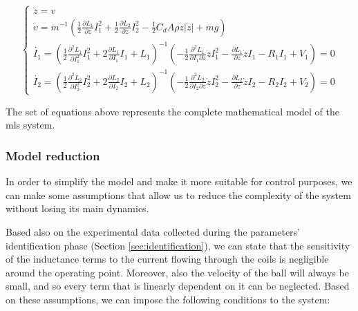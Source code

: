 \begin{equation}
    \begin{cases}
        \dot{z} = v                                                                                                                                                                                                                                                                                       \\
        \dot{v} = m^{-1} \left(\frac{1}{2} \frac{\partial L_1}{\partial z} I_1^2 + \frac{1}{2} \frac{\partial L_2}{\partial z} I_2^2 - \frac{1}{2} C_d A \rho \dot{z} |\dot{z}| + m g  \right)                                                                                                            \\

        \dot{I_1} = \left( \frac{1}{2} \frac{\partial^2 L_1}{\partial I_1^2} I_1^2 + 2\frac{\partial L_1}{\partial I_1} I_1 + L_1 \right)^{-1} \left( -\frac{1}{2} \frac{\partial^2 L_1}{\partial I_1 \partial z} \dot{z} I_1^2 - \frac{\partial L_1}{\partial z} \dot{z} I_1 - R_1 I_1 + V_1 \right) = 0 \\
        \dot{I_2} = \left( \frac{1}{2} \frac{\partial^2 L_2}{\partial I_2^2} I_2^2 + 2\frac{\partial L_2}{\partial I_2} I_2 + L_2 \right)^{-1} \left( -\frac{1}{2} \frac{\partial^2 L_2}{\partial I_2 \partial z} \dot{z} I_2^2 - \frac{\partial L_2}{\partial z} \dot{z} I_2 - R_2 I_2 + V_2 \right) = 0
    \end{cases}
    \label{eq:equations_of_motion_full}
\end{equation}

The set of equations above represents the complete mathematical model of the \acrshort{mls} system.



\subsubsection{Model reduction}
\label{subsubsec:model_reduction}

In order to simplify the model and make it more suitable for control purposes, we can make some assumptions that allow us to reduce the complexity of the system without losing its main dynamics.

Based also on the experimental data collected during the parameters' identification phase (Section \ref{sec:identification}), we can state that the sensitivity of the inductance terms to the current flowing through the coils is negligible around the operating point.
Moreover, also the velocity of the ball will always be small, and so every term that is linearly dependent on it can be neglected.
Based on these assumptions, we can impose the following conditions to the system:

